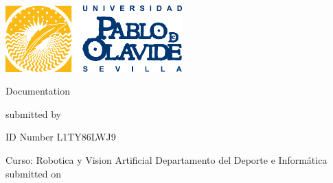 \newpage
\thispagestyle{empty}
\begin{titlepage}%
\includegraphics[width=6.8cm]{./pic/logo-main.png_867452570.jpg}
\begin{center}\Large
	\vfill
	Documentation
    \vfill
	\makeatletter
	{\Large\textsf{\textbf{\@title}}\par}
	\makeatother
	\vfill
	submitted by
	\par\bigskip
	\makeatletter
	{\@author} \par
	\makeatother
	ID Number L1TY86LWJ9 \par
	Curso: Robotica y Vision Artificial	
	\vfill
	Departamento del Deporte e Informática
	\vfill
	\makeatletter
	submitted on {\@date}
	\makeatother
\end{center}
\end{titlepage}
